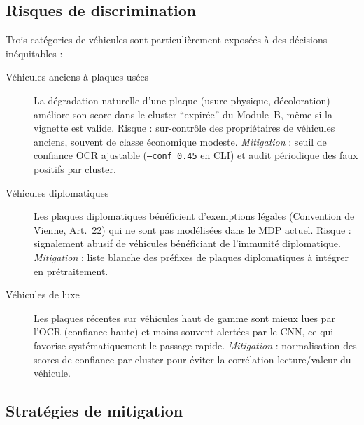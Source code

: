 \subsection{Risques de discrimination}
\label{sec:d:discrimination}

Trois cat\'{e}gories de v\'{e}hicules sont particuli\`{e}rement expos\'{e}es
\`{a} des d\'{e}cisions in\'{e}quitables :

\begin{description}
  \item[V\'{e}hicules anciens \`{a} plaques us\'{e}es]
    La d\'{e}gradation naturelle d'une plaque (usure physique, d\'{e}coloration)
    am\'{e}liore son score dans le cluster ``expir\'{e}e'' du Module~B,
    m\^{e}me si la vignette est valide. Risque : sur-contr\^{o}le des
    propri\'{e}taires de v\'{e}hicules anciens, souvent de classe
    \'{e}conomique modeste.
    \textit{Mitigation} : seuil de confiance OCR ajustable (\texttt{--conf 0.45}
    en CLI) et audit p\'{e}riodique des faux positifs par cluster.

  \item[V\'{e}hicules diplomatiques]
    Les plaques diplomatiques b\'{e}n\'{e}ficient d'exemptions l\'{e}gales
    (Convention de Vienne, Art.~22) qui ne sont pas mod\'{e}lis\'{e}es
    dans le MDP actuel. Risque : signalement abusif de v\'{e}hicules
    b\'{e}n\'{e}ficiant de l'immunit\'{e} diplomatique.
    \textit{Mitigation} : liste blanche des pr\'{e}fixes de plaques
    diplomatiques \`{a} int\'{e}grer en pr\'{e}traitement.

  \item[V\'{e}hicules de luxe]
    Les plaques r\'{e}centes sur v\'{e}hicules haut de gamme sont mieux
    lues par l'OCR (confiance haute) et moins souvent alert\'{e}es par le
    CNN, ce qui favorise syst\'{e}matiquement le passage rapide.
    \textit{Mitigation} : normalisation des scores de confiance par
    cluster pour \'{e}viter la corr\'{e}lation lecture/valeur du v\'{e}hicule.
\end{description}

\subsection{Strat\'{e}gies de mitigation}
\label{sec:d:mitigation}

